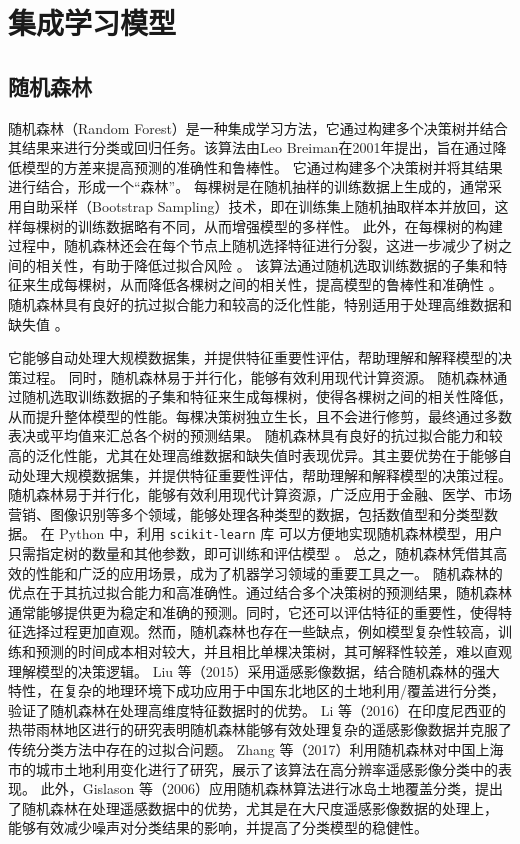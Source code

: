 \documentclass[AutoFakeBold]{LZUThesis-PgD&PhD}
\begin{document}
	\section{集成学习模型}
	
	\subsection{随机森林}
	
	随机森林（Random Forest）是一种集成学习方法，它通过构建多个决策树并结合其结果来进行分类或回归任务。该算法由Leo Breiman在2001年提出，旨在通过降低模型的方差来提高预测的准确性和鲁棒性。
	它通过构建多个决策树并将其结果进行结合，形成一个“森林”。
	每棵树是在随机抽样的训练数据上生成的，通常采用自助采样（Bootstrap Sampling）技术，即在训练集上随机抽取样本并放回，这样每棵树的训练数据略有不同，从而增强模型的多样性。
	此外，在每棵树的构建过程中，随机森林还会在每个节点上随机选择特征进行分裂，这进一步减少了树之间的相关性，有助于降低过拟合风险 \cite{breiman2001random}。
	该算法通过随机选取训练数据的子集和特征来生成每棵树，从而降低各棵树之间的相关性，提高模型的鲁棒性和准确性 \cite{liaw2002random}。
	随机森林具有良好的抗过拟合能力和较高的泛化性能，特别适用于处理高维数据和缺失值 \cite{ishwaran2008random}。

	它能够自动处理大规模数据集，并提供特征重要性评估，帮助理解和解释模型的决策过程。
	同时，随机森林易于并行化，能够有效利用现代计算资源。
	随机森林通过随机选取训练数据的子集和特征来生成每棵树，使得各棵树之间的相关性降低，从而提升整体模型的性能。每棵决策树独立生长，且不会进行修剪，最终通过多数表决或平均值来汇总各个树的预测结果。
	随机森林具有良好的抗过拟合能力和较高的泛化性能，尤其在处理高维数据和缺失值时表现优异。其主要优势在于能够自动处理大规模数据集，并提供特征重要性评估，帮助理解和解释模型的决策过程。
	随机森林易于并行化，能够有效利用现代计算资源，广泛应用于金融、医学、市场营销、图像识别等多个领域，能够处理各种类型的数据，包括数值型和分类型数据。
	在 Python 中，利用 \texttt{scikit-learn} 库 \cite{scikit-learn} 可以方便地实现随机森林模型，用户只需指定树的数量和其他参数，即可训练和评估模型 \cite{random_forest_sklearn}。
	总之，随机森林凭借其高效的性能和广泛的应用场景，成为了机器学习领域的重要工具之一。
	随机森林的优点在于其抗过拟合能力和高准确性。通过结合多个决策树的预测结果，随机森林通常能够提供更为稳定和准确的预测。同时，它还可以评估特征的重要性，使得特征选择过程更加直观。然而，随机森林也存在一些缺点，例如模型复杂性较高，训练和预测的时间成本相对较大，并且相比单棵决策树，其可解释性较差，难以直观理解模型的决策逻辑。
	Liu 等（2015）采用遥感影像数据，结合随机森林的强大特性，在复杂的地理环境下成功应用于中国东北地区的土地利用/覆盖进行分类，
	验证了随机森林在处理高维度特征数据时的优势\cite{liu2015}。
	Li 等（2016）在印度尼西亚的热带雨林地区进行的研究表明随机森林能够有效处理复杂的遥感影像数据并克服了传统分类方法中存在的过拟合问题\cite{li2016}。
	Zhang 等（2017）利用随机森林对中国上海市的城市土地利用变化进行了研究，展示了该算法在高分辨率遥感影像分类中的表现\cite{zhang2017}。
	此外，Gislason 等（2006）应用随机森林算法进行冰岛土地覆盖分类，提出了随机森林在处理遥感数据中的优势，尤其是在大尺度遥感影像数据的处理上，
	能够有效减少噪声对分类结果的影响，并提高了分类模型的稳健性\cite{gislason2006}。
	
\end{document}
